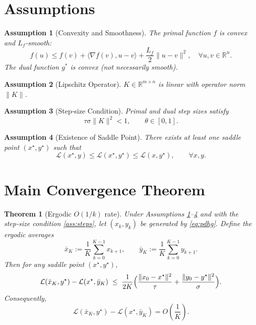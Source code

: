 \documentclass{article}
\newtheorem{theorem}{Theorem}
\newtheorem{assumption}{Assumption}
\begin{document}
\newpage
\section*{Assumptions}
\begin{assumption}[Convexity and Smoothness]\label{ass:convex}
The primal function $f$ is convex and $L_f$‑smooth:
\[
f(u)\le f(v)+\langle\nabla f(v),u-v\rangle+\frac{L_f}{2}\|u-v\|^{2},
\quad\forall u,v\in\mathbb{R}^{n}.
\]
The dual function $g^{*}$ is convex (not necessarily smooth).
\end{assumption}
\begin{assumption}[Lipschitz Operator]\label{ass:K}
$K\in\mathbb{R}^{m\times n}$ is linear with operator norm $\|K\|$.
\end{assumption}
\begin{assumption}[Step‑size Condition]\label{ass:steps}
Primal and dual step sizes satisfy
\[
\tau\sigma\|K\|^{2}<1,\qquad \theta\in[0,1].
\]
\end{assumption}
\begin{assumption}[Existence of Saddle Point]\label{ass:saddle}
There exists at least one saddle point $(x^{\star},y^{\star})$ such that
\[
\mathcal{L}(x^{\star},y)\le \mathcal{L}(x^{\star},y^{\star})\le \mathcal{L}(x,y^{\star}),\qquad\forall x,y.
\]
\end{assumption}

\section*{Main Convergence Theorem}
\begin{theorem}[Ergodic $O(1/k)$ rate]\label{thm:rate}
Under Assumptions \ref{ass:convex}–\ref{ass:saddle} and with the step‑size condition \eqref{ass:steps},
let $(x_k,y_k)$ be generated by \eqref{eq:pdhg}. Define the ergodic averages
\[
\bar{x}_{K}:=\frac{1}{K}\sum_{k=0}^{K-1}x_{k+1},\qquad
\bar{y}_{K}:=\frac{1}{K}\sum_{k=0}^{K-1}y_{k+1}.
\]
Then for any saddle point $(x^{\star},y^{\star})$,
\[
\mathcal{L}(\bar{x}_{K},y^{\star})-\mathcal{L}(x^{\star},\bar{y}_{K})
\;\le\;
\frac{1}{2K}\Bigl(
\frac{\|x_{0}-x^{\star}\|^{2}}{\tau}
+\frac{\|y_{0}-y^{\star}\|^{2}}{\sigma}
\Bigr).
\]
Consequently,
\[
\mathcal{L}(\bar{x}_{K},y^{\star})-\mathcal{L}(x^{\star},\bar{y}_{K})=O\!\left(\frac{1}{K}\right).
\]
\end{theorem}
\end{document}

